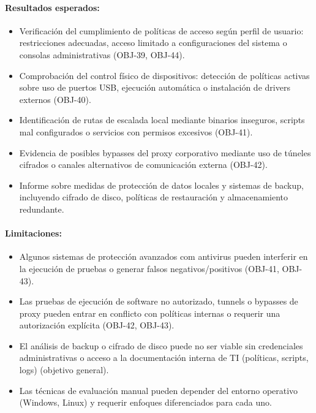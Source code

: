 \documentclass[a4paper, 10pt]{article}
\begin{document}
\paragraph{Resultados esperados:}
\begin{itemize}
    \item Verificación del cumplimiento de políticas de acceso según perfil de usuario: restricciones adecuadas, acceso limitado a configuraciones del sistema o consolas administrativas (OBJ-39, OBJ-44).
    \item Comprobación del control físico de dispositivos: detección de políticas activas sobre uso de puertos USB, ejecución automática o instalación de drivers externos (OBJ-40).
    \item Identificación de rutas de escalada local mediante binarios inseguros, scripts mal configurados o servicios con permisos excesivos (OBJ-41).
    \item Evidencia de posibles bypasses del proxy corporativo mediante uso de túneles cifrados o canales alternativos de comunicación externa (OBJ-42).
    \item Informe sobre medidas de protección de datos locales y sistemas de backup, incluyendo cifrado de disco, políticas de restauración y almacenamiento redundante.
\end{itemize}

\paragraph{Limitaciones:}
\begin{itemize}
    \item Algunos sistemas de protección avanzados com antivirus pueden interferir en la ejecución de pruebas o generar falsos negativos/positivos (OBJ-41, OBJ-43).
    \item Las pruebas de ejecución de software no autorizado, tunnels o bypasses de proxy pueden entrar en conflicto con políticas internas o requerir una autorización explícita (OBJ-42, OBJ-43).
    \item El análisis de backup o cifrado de disco puede no ser viable sin credenciales administrativas o acceso a la documentación interna de TI (políticas, scripts, logs) (objetivo general).
    \item Las técnicas de evaluación manual pueden depender del entorno operativo (Windows, Linux) y requerir enfoques diferenciados para cada uno.
\end{itemize}
\end{document}
